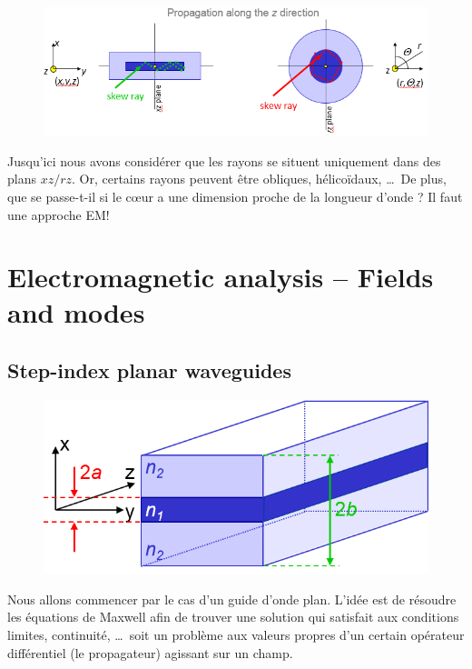 \begin{figure}
	\vspace{-5mm}
	\includegraphics[scale=0.45]{ch1/image7}
	\end{figure}
Jusqu'ici nous avons considérer que les rayons se situent uniquement dans des plans $xz/rz$. Or, 
certains rayons peuvent être obliques, hélicoïdaux, \dots\ De plus, que se passe-t-il si le 
cœur a une dimension proche de la longueur d'onde ? Il faut une approche EM!

\section{Electromagnetic analysis – Fields and modes}
\subsection{Step-index planar waveguides}

\begin{figure}
	\vspace{-5mm}
	\includegraphics[scale=0.4]{ch1/image10}
	\end{figure}
Nous allons commencer par le cas d'un guide d'onde plan. L'idée est de résoudre les équations de 
Maxwell afin de trouver une solution qui satisfait aux conditions limites, continuité, \dots\ soit 
un problème aux valeurs propres d'un certain opérateur différentiel (le propagateur) agissant sur un 
champ.\\

